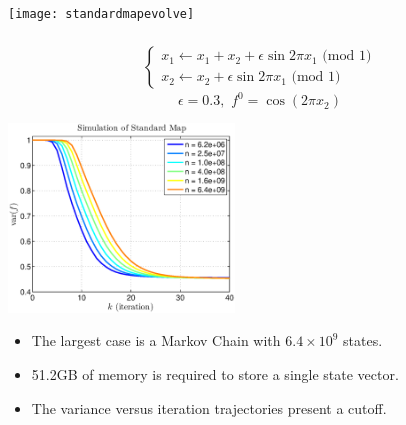 \documentclass[12pt,t]{beamer}
\begin{document}
\begin{frame}

\centerline{
\texttt{[image: standardmapevolve]}
}
   \begin{align*}
   \\[-1cm]
     \begin{cases}
        x_1 \leftarrow x_1+x_2 +\epsilon \sin{2 \pi x_1}  \mbox{ (mod } 1)\\
        x_2 \leftarrow  x_2 +\epsilon \sin{2 \pi x_1}     \mbox{ (mod } 1)
     \end{cases}
   \end{align*}
   \begin{equation*}
      \epsilon=0.3, \,\, f^0   = \cos(2\pi x_2)
   \end{equation*}

\end{frame}
\begin{frame}

\begin{center}
    \includegraphics[width=0.45\textwidth,trim=1cm 1cm 0cm 0cm]{standardmapcutoff2}
\end{center}
  \begin{itemize}
    \item The largest case is a Markov Chain with $6.4\times 10^9$ states.
    \item 51.2GB of memory is required to store a single state vector.
    \item The variance versus iteration trajectories present a cutoff. 
\end{itemize}

\end{frame}
\end{document}
